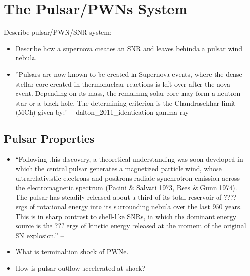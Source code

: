 \section{The Pulsar/\acp{PWN} System}

Describe pulsar/PWN/SNR system:

\begin{itemize}
  \item Describe how a supernova creates an SNR and leaves behinda
    a pulsar wind nebula. 
  \item ``Pulsars are now known to be created in Supernova events,
    where the dense stellar core created in thermonuclear reactions is
    left over after the nova event. Depending on its mass, the remaining
    solar core may form a neutron star or a black hole. The determining
    criterion is the Chandrasekhar limit (MCh) given by:'' -- dalton\_2011\_identication-gamma-ray
\end{itemize}

\subsection{Pulsar Properties}









\begin{itemize}
  \item ``Following this discovery, a theoretical understanding was
  soon developed in which the central pulsar generates a magnetized
  particle wind, whose ultrarelativistic electrons and positrons radiate
  synchrotron emission across the electromagnetic spectrum (Pacini \&
  Salvati 1973, Rees \& Gunn 1974). The pulsar has steadily released
  about a third of its total reservoir of ???? ergs
  of rotational energy into its surrounding nebula over the last 950
  years. This is in sharp contrast to shell-like SNRs, in which the
  dominant energy source is the ??? ergs of kinetic energy
  released at the moment of the original SN explosion.''  -- \cite{gaensler_2006_evolution-structure}
  \item 
    What is terminaltion shock of PWNe.
  \item 
    How is pulsar outflow accelerated at shock?
\end{itemize}


